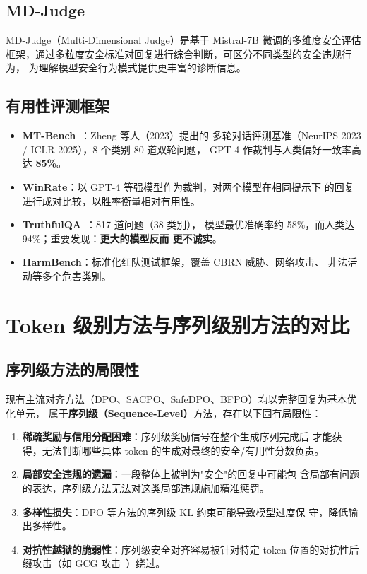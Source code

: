 \documentclass[12pt,a4paper,UTF8]{ctexart}
\begin{document}
\subsection{MD-Judge}

MD-Judge（Multi-Dimensional Judge）是基于 Mistral-7B 微调的多维度安全评估
框架，通过多粒度安全标准对回复进行综合判断，可区分不同类型的安全违规行为，
为理解模型安全行为模式提供更丰富的诊断信息。

\subsection{有用性评测框架}

\begin{itemize}[leftmargin=2em]
  \item \textbf{MT-Bench}~\cite{zheng2023mtbench}：Zheng 等人（2023）提出的
    多轮对话评测基准（NeurIPS 2023 / ICLR 2025），8 个类别 80 道双轮问题，
    GPT-4 作裁判与人类偏好一致率高达 \textbf{85\%}。
  \item \textbf{WinRate}：以 GPT-4 等强模型作为裁判，对两个模型在相同提示下
    的回复进行成对比较，以胜率衡量相对有用性。
  \item \textbf{TruthfulQA}~\cite{lin2022truthfulqa}：817 道问题（38 类别），
    模型最优准确率约 58\%，而人类达 94\%；重要发现：\textbf{更大的模型反而
    更不诚实}。
  \item \textbf{HarmBench}：标准化红队测试框架，覆盖 CBRN 威胁、网络攻击、
    非法活动等多个危害类别。
\end{itemize}

\section{Token 级别方法与序列级别方法的对比}
\label{sec:token}

\subsection{序列级方法的局限性}

现有主流对齐方法（DPO、SACPO、SafeDPO、BFPO）均以完整回复为基本优化单元，
属于\textbf{序列级（Sequence-Level）}方法，存在以下固有局限性：

\begin{enumerate}[leftmargin=2em]
  \item \textbf{稀疏奖励与信用分配困难}：序列级奖励信号在整个生成序列完成后
    才能获得，无法判断哪些具体 token 的生成对最终的安全/有用性分数负责。
  \item \textbf{局部安全违规的遗漏}：一段整体上被判为"安全"的回复中可能包
    含局部有问题的表达，序列级方法无法对这类局部违规施加精准惩罚。
  \item \textbf{多样性损失}：DPO 等方法的序列级 KL 约束可能导致模型过度保
    守，降低输出多样性。
  \item \textbf{对抗性越狱的脆弱性}：序列级安全对齐容易被针对特定 token
    位置的对抗性后缀攻击（如 GCG 攻击~\cite{zou2023gcg}）绕过。
\end{enumerate}
\end{document}
